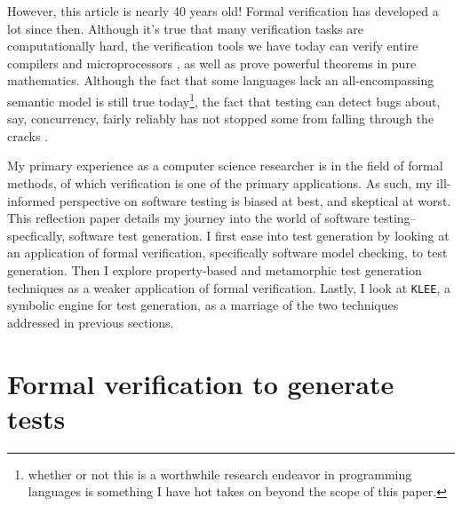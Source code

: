 \documentclass[acmsmall,review, nonacm]{acmart}
\begin{document}
However, this article is nearly 40 years old! Formal verification has developed a lot since then. Although it's true that many verification tasks are computationally hard, the verification tools we have today can verify entire compilers \cite{kiam2019cakeml} and microprocessors \cite{hardin2010design}, as well as prove powerful theorems in pure mathematics. Although the fact that some languages lack an all-encompassing semantic model is still true today\footnote{whether or not this is a worthwhile research endeavor in programming languages is something I have hot takes on beyond the scope of this paper.}, the fact that testing can detect bugs about, say, concurrency, fairly reliably has not stopped some from falling through the cracks \cite{gates_2023}.

My primary experience as a computer science researcher is in the field of formal methods, of which verification is one of the primary applications. As such, my ill-informed perspective on software testing is biased at best, and skeptical at worst. This reflection paper details my journey into the world of software testing--specfically, software test generation. I first ease into test generation by looking at an application of formal verification, specifically software model checking, to test generation. Then I explore property-based and metamorphic test generation techniques as a weaker application of formal verification. Lastly, I look at \texttt{KLEE}, a symbolic engine for test generation, as a marriage of the two techniques addressed in previous sections.

\section{Formal verification to generate tests}
\end{document}
